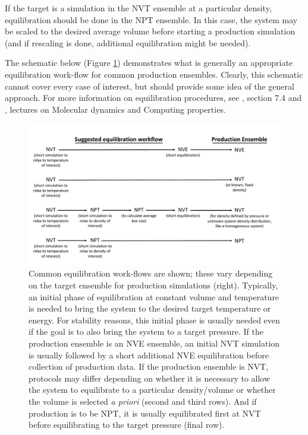 \documentclass[9pt,bestpractices]{livecoms}
\begin{document}
If the target is a simulation in the NVT ensemble at a particular density, equilibration should be done in the NPT ensemble.
In this case, the system may be scaled to the desired average volume before starting a production simulation (and if rescaling is done, additional equilibration might be needed).

The schematic below (Figure \ref{eqworkflow}) demonstrates what is generally an appropriate equilibration work-flow for common production ensembles.
Clearly, this schematic cannot cover every case of interest, but should provide some idea of the general approach.
For more information on equilibration procedures, see \citet{LeachBook}, section 7.4 and \citet{ShellNotes}, lectures on Molecular dynamics and Computing properties.

\begin{figure}[h]
\centering
\includegraphics[width=\linewidth]{Equilibration_Workflow.pdf}
\caption{Common equilibration work-flows are shown; these vary depending on the target ensemble for production simulations (right).
Typically, an initial phase of equilibration at constant volume and temperature is needed to bring the system to the desired target temperature or energy.
For stability reasons, this initial phase is usually needed even if the goal is to also bring the system to a target pressure.
If the production ensemble is an NVE ensemble, an initial NVT simulation is usually followed by a short additional NVE equilibration before collection of production data.
If the production ensemble is NVT, protocols may differ depending on whether it is necessary to allow the system to equilibrate to a particular density/volume or whether the volume is selected \emph{a priori} (second and third rows).
And if production is to be NPT, it is usually equilibrated first at NVT before equilibrating to the target pressure (final row).}
\label{eqworkflow}
\end{figure}
\end{document}
